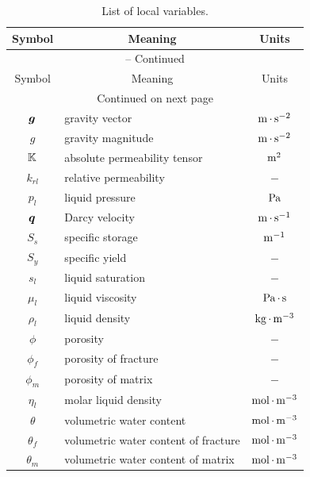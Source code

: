 \begin{center}
\begin{longtable}{cp{7cm}c}
\caption{List of local variables.} \label{table:flow-list-of-variables} \\

\multicolumn{1}{c}{Symbol} & \multicolumn{1}{c}{Meaning} & \multicolumn{1}{c}{Units} \\
\hline  \hline 
\endfirsthead

\multicolumn{3}{c}{{\tablename} \thetable{} -- Continued} \\
\multicolumn{1}{c}{Symbol} & \multicolumn{1}{c}{Meaning} & \multicolumn{1}{c}{Units} \\
\hline  \hline 
\endhead

\hline \multicolumn{3}{c}{{Continued on next page}} \\ 
\hline \hline 
\endfoot

\hline \hline
\endlastfoot

${\boldsymbol{g}}$      & gravity vector       &  ${\rm m}{\,\cdot\,}{\rm s}^{-2}$  \\
$g$        & gravity magnitude    &  ${\rm m}{\,\cdot\,}{\rm s}^{-2}$  \\
${\mathbb K}$       & absolute permeability tensor & ${\rm m}^2$ \\
$k_{rl}$   & relative permeability&  $-$ \\
$p_l$      & liquid pressure      &  ${\rm Pa}$ \\
${\boldsymbol{q}}$      & Darcy velocity       &  ${\rm m}{\,\cdot\,}{\rm s}^{-1}$  \\
$S_s$      & specific storage     &  ${\rm m}^{-1}$  \\
$S_y$      & specific yield       &  $-$  \\
$s_l$      & liquid saturation    &  $-$ \\
$\mu_l$    & liquid viscosity     &  ${\rm Pa}{\,\cdot\,}{\rm s}$ \\
$\rho_l$   & liquid density       &  ${\rm kg}{\,\cdot\,}{\rm m}^{-3}$ \\
$\phi$     & porosity             &  $-$  \\
$\phi_f$   & porosity of fracture &  $-$  \\
$\phi_m$   & porosity of matrix   &  $-$  \\
$\eta_l$   & molar liquid density &  ${\rm mol}{\,\cdot\,}{\rm m}^{-3}$ \\
$\theta$   & volumetric water content  &  ${\rm mol}{\,\cdot\,}{\rm m}^{-3}$ \\
$\theta_f$ & volumetric water content of fracture &  ${\rm mol}{\,\cdot\,}{\rm m}^{-3}$ \\
$\theta_m$ & volumetric water content of matrix   &  ${\rm mol}{\,\cdot\,}{\rm m}^{-3}$ \\

\end{longtable}
\end{center}


